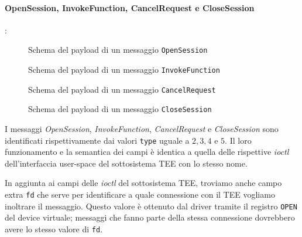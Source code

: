 \documentclass[12pt,italian]{report}
\begin{document}
\paragraph{OpenSession, InvokeFunction, CancelRequest e CloseSession}: \\
\begin{figure}[H]
    \centering
    \caption{Schema del payload di un messaggio \texttt{OpenSession}}
    \label{fig:msg-schema-opensession}
\end{figure}

\begin{figure}[H]
    \centering
    \caption{Schema del payload di un messaggio \texttt{InvokeFunction}}
    \label{fig:msg-schema-invokefunction}
\end{figure}

\begin{figure}[H]
    \centering
    \caption{Schema del payload di un messaggio \texttt{CancelRequest}}
    \label{fig:msg-schema-cancelrequest}
\end{figure}

\begin{figure}[h]
    \centering
    \caption{Schema del payload di un messaggio \texttt{CloseSession}}
    \label{fig:msg-schema-closesession}
\end{figure}

I messaggi \textit{OpenSession}, \textit{InvokeFunction}, \textit{CancelRequest}
e \textit{CloseSession} sono identificati rispettivamente dai valori \texttt{type}
uguale a $2, 3, 4$ e $5$.
Il loro funzionamento e la semantica dei campi è identica a quella delle
rispettive \textit{ioctl} dell'interfaccia user-space del sottosistema TEE
con lo stesso nome.

In aggiunta ai campi delle \textit{ioctl} del sottosistema TEE, troviamo anche
campo extra \texttt{fd} che serve per identificare a quale connessione con
il TEE vogliamo inoltrare il messaggio.
Questo valore è ottenuto dal driver tramite il registro \texttt{OPEN} del
device virtuale; messaggi che fanno parte della stessa connessione dovrebbero
avere lo stesso valore di \texttt{fd}.
\end{document}
